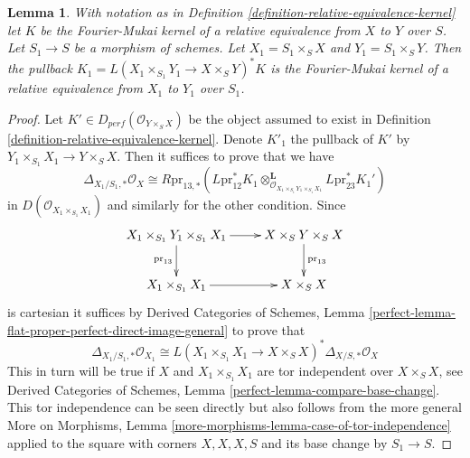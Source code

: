 \documentclass{stacks-project}
\theoremstyle{plain}
\newtheorem{lemma}[subsection]{Lemma}
\theoremstyle{definition}
\theoremstyle{remark}
\numberwithin{equation}{subsection}
\begin{document}
\begin{lemma}
\label{lemma-base-change-rek}
With notation as in Definition \ref{definition-relative-equivalence-kernel}
let $K$ be the Fourier-Mukai kernel of a relative equivalence from $X$
to $Y$ over $S$. Let $S_1 \to S$ be a morphism of schemes. Let
$X_1 = S_1 \times_S X$ and $Y_1 = S_1 \times_S Y$. Then the pullback
$K_1 = L(X_1 \times_{S_1} Y_1 \to X \times_S Y)^*K$ is
the Fourier-Mukai kernel of a relative equivalence from $X_1$
to $Y_1$ over $S_1$.
\end{lemma}

\begin{proof}
Let $K' \in D_{perf}(\mathcal{O}_{Y \times_S X})$ be the object assumed to
exist in Definition \ref{definition-relative-equivalence-kernel}.
Denote $K'_1$ the pullback of $K'$ by
$Y_1 \times_{S_1} X_1 \to Y \times_S X$.
Then it suffices to prove that we have
$$
\Delta_{X_1/S_1, *}\mathcal{O}_X \cong
R\text{pr}_{13, *}(L\text{pr}_{12}^*K_1
\otimes_{\mathcal{O}_{X_1 \times_{S_1} Y_1 \times_{S_1} X_1}}^\mathbf{L}
L\text{pr}_{23}^*K_1')
$$
in $D(\mathcal{O}_{X_1 \times_{S_1} X_1})$ and similarly for the other
condition. Since
$$
\xymatrix{
X_1 \times_{S_1} Y_1 \times_{S_1} X_1 \ar[r] \ar[d]_{\text{pr}_{13}} &
X \times_S Y \times_S X \ar[d]^{\text{pr}_{13}} \\
X_1 \times_{S_1} X_1 \ar[r] &
X \times_S X
}
$$
is cartesian it suffices by Derived Categories of Schemes, Lemma
\ref{perfect-lemma-flat-proper-perfect-direct-image-general}
to prove that
$$
\Delta_{X_1/S_1, *}\mathcal{O}_{X_1}
\cong
L(X_1 \times_{S_1} X_1 \to X \times_S X)^*\Delta_{X/S, *}\mathcal{O}_X 
$$
This in turn will be true if $X$ and $X_1 \times_{S_1} X_1$ are tor
independent over $X \times_S X$, see
Derived Categories of Schemes, Lemma \ref{perfect-lemma-compare-base-change}.
This tor independence can be seen directly but also follows from
the more general More on Morphisms, Lemma
\ref{more-morphisms-lemma-case-of-tor-independence} applied to the square
with corners $X, X, X, S$ and its base change by $S_1 \to S$.
\end{proof}
\end{document}

